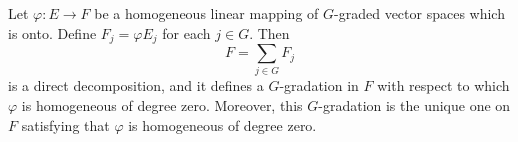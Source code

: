 Let $\varphi: E \rightarrow F$ be a homogeneous linear mapping of $G$-graded vector spaces which is onto. Define $F_j = \varphi E_j$ for each $j \in G$. Then
$$F = \sum_{j \in G} F_j$$
is a direct decomposition, and it defines a $G$-gradation in $F$ with respect to which $\varphi$ is homogeneous of degree zero. Moreover, this $G$-gradation is the unique one on $F$ satisfying that $\varphi$ is homogeneous of degree zero.
